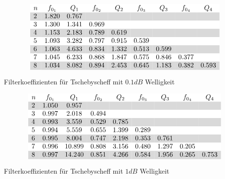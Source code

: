 \begin{table}[h!]
\[ \begin{array}{@{}lcccccccc}
\rowcolor{white} n & f_{0_1}& Q_1   & f_{0_2}   & Q_2   & f_{0_3}   & Q_3   & f_{0_4}   & Q_4   \\
\rowcolor{lgray} 2 & 1.820  & 0.767 &           &       &           &       &           &       \\
\rowcolor{white} 3 & 1.300  & 1.341 & 0.969     &       &           &       &           &       \\
\rowcolor{lgray} 4 & 1.153  & 2.183 & 0.789     & 0.619 &           &       &           &       \\
\rowcolor{white} 5 & 1.093  & 3.282 & 0.797     & 0.915 & 0.539     &       &           &       \\
\rowcolor{lgray} 6 & 1.063  & 4.633 & 0.834     & 1.332 & 0.513     & 0.599 &           &       \\
\rowcolor{white} 7 & 1.045  & 6.233 & 0.868     & 1.847 & 0.575     & 0.846 & 0.377     &       \\
\rowcolor{lgray} 8 & 1.034  & 8.082 & 0.894     & 2.453 & 0.645     & 1.183 & 0.382     & 0.593 \\
\end{array} \]
\caption{Filterkoeffizienten für Tschebyscheff mit $0.1 dB$ Welligkeit}
\label{tab:filt-coeff-tsche01}
\end{table}

\begin{table}[h!]
\[ \begin{array}{@{}lcccccccc}
\rowcolor{white} n & f_{0_1}& Q_1   & f_{0_2}   & Q_2   & f_{0_3}   & Q_3   & f_{0_4}   & Q_4   \\
\rowcolor{lgray} 2 & 1.050  & 0.957 &           &       &           &       &           &       \\
\rowcolor{white} 3 & 0.997  & 2.018 & 0.494     &       &           &       &           &       \\
\rowcolor{lgray} 4 & 0.993  & 3.559 & 0.529     & 0.785 &           &       &           &       \\
\rowcolor{white} 5 & 0.994  & 5.559 & 0.655     & 1.399 & 0.289     &       &           &       \\
\rowcolor{lgray} 6 & 0.995  & 8.004 & 0.747     & 2.198 & 0.353     & 0.761 &           &       \\
\rowcolor{white} 7 & 0.996  &10.899 & 0.808     & 3.156 & 0.480     & 1.297 & 0.205     &       \\
\rowcolor{lgray} 8 & 0.997  &14.240 & 0.851     & 4.266 & 0.584     & 1.956 & 0.265     & 0.753 \\
\end{array} \]
\caption{Filterkoeffizienten für Tschebyscheff mit $1 dB$ Welligkeit}
\label{tab:filt-coeff-tsche1}
\end{table}
